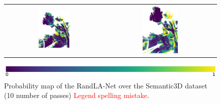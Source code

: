 \begin{figure}[h!]
\begin{tabular}{cc}
            \includegraphics[width=0.33\textwidth, height=0.18\textheight]{images/ood_imgs/fout_sem3d/fout_ent_3.png}&
            \includegraphics[width=0.33\textwidth, height=0.18\textheight]{images/sem3d_of/fout_ent_sem3d_of_3.png}\\
        \end{tabular}
        \includegraphics[scale=0.45]{images/prob_legend.pdf}
        \caption{Probability map of the RandLA-Net over the Semantic3D dataset (10 number of passes) \textcolor{red}{Legend spelling mistake}.}
        \label{fig:fout_entmap_vis_sem3d_OF}
    \end{figure} 
    \FloatBarrier


